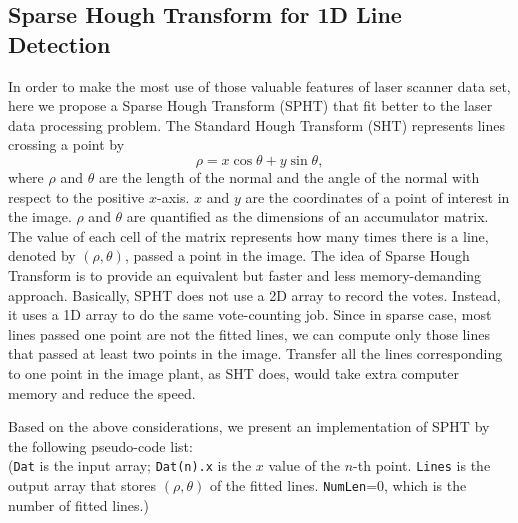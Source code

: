 \documentclass{cdcarta4}
\begin{document}
\subsection{Sparse Hough Transform for 1D Line Detection}
\label{sec22}

In order to make the most use of those valuable features of laser scanner data set, 
 here we propose a Sparse Hough Transform (SPHT) that fit better to the laser data processing problem. The Standard Hough Transform (SHT) represents lines crossing a point by 
%
$$ \rho = x \cos\theta + y \sin\theta, $$
%
where $\rho$ and $\theta$ are the length of the normal and the angle of the normal with respect to the positive $x$-axis. $x$ and $y$ are the coordinates of a   point of interest in the image.   $\rho$ and $\theta$ are quantified as the dimensions of an accumulator matrix. The value of each cell of the matrix represents how many times there is a line, denoted by $(\rho, \theta)$, passed a point in the image. The idea of Sparse Hough Transform is to provide an equivalent but faster and less memory-demanding approach. Basically, SPHT does not use a 2D array to record the votes. Instead, it uses a 1D  array to do the same vote-counting job. Since in sparse case, most lines passed one point are not the fitted lines, we can compute only those lines that passed at least two points in the image. Transfer all the lines corresponding to one point in the image plant, as SHT does, would take extra computer memory and reduce the speed. 


Based on the above considerations, we present an 
 implementation of SPHT by the following   pseudo-code list:\\
(\texttt{Dat} is the input array; \texttt{Dat(n).x} is the $x$ value of the $n$-th point. 
\texttt{Lines} is the output array that stores $(\rho,\theta)$ of the fitted lines.
\texttt{NumLen}=0, which is the number of fitted lines.)
\end{document}
